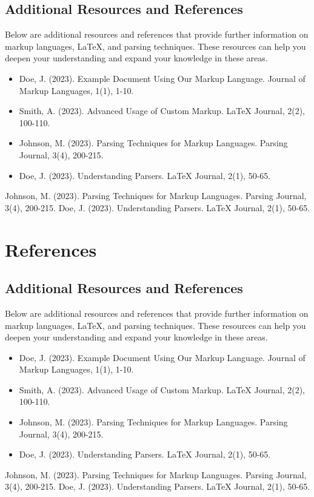 \documentclass[oneside]{book}
\begin{document}
\section{Additional Resources and References}
Below are additional resources and references that provide further information on markup languages, LaTeX, and parsing techniques. These resources can help you deepen your understanding and expand your knowledge in these areas.\par
\begin{itemize}
\item Doe, J. (2023). Example Document Using Our Markup Language. Journal of Markup Languages, 1(1), 1-10.
\item Smith, A. (2023). Advanced Usage of Custom Markup. LaTeX Journal, 2(2), 100-110.
\item Johnson, M. (2023). Parsing Techniques for Markup Languages. Parsing Journal, 3(4), 200-215.
\item Doe, J. (2023). Understanding Parsers. LaTeX Journal, 2(1), 50-65.
\end{itemize}
\begin{thebibliography}{100}
Johnson, M. (2023). Parsing Techniques for Markup Languages. Parsing Journal, 3(4), 200-215.
Doe, J. (2023). Understanding Parsers. LaTeX Journal, 2(1), 50-65.
\end{thebibliography}

\newpage
\chapter{References}
\section{Additional Resources and References}
Below are additional resources and references that provide further information on markup languages, LaTeX, and parsing techniques. These resources can help you deepen your understanding and expand your knowledge in these areas.\par
\begin{itemize}
\item Doe, J. (2023). Example Document Using Our Markup Language. Journal of Markup Languages, 1(1), 1-10.
\item Smith, A. (2023). Advanced Usage of Custom Markup. LaTeX Journal, 2(2), 100-110.
\item Johnson, M. (2023). Parsing Techniques for Markup Languages. Parsing Journal, 3(4), 200-215.
\item Doe, J. (2023). Understanding Parsers. LaTeX Journal, 2(1), 50-65.
\end{itemize}
\begin{thebibliography}{100}
Johnson, M. (2023). Parsing Techniques for Markup Languages. Parsing Journal, 3(4), 200-215.
Doe, J. (2023). Understanding Parsers. LaTeX Journal, 2(1), 50-65.
\end{thebibliography}
\end{document}
